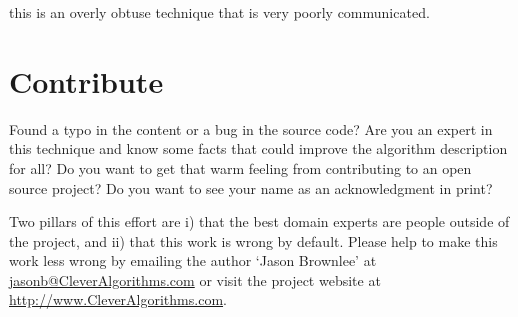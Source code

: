 \documentclass[a4paper, 11pt]{article}
\makeatletter
\newcommand{\myreportauthor}{Jason Brownlee}
\newcommand{\myreportemail}{jasonb@CleverAlgorithms.com}
\newcommand{\myreportwebsite}{http://www.CleverAlgorithms.com}
\makeatother
\begin{document}
this is an overly obtuse technique that is very poorly communicated.


% 
% 
\section{Contribute}
\label{sec:contribute}
Found a typo in the content or a bug in the source code? 
Are you an expert in this technique and know some facts that could improve the algorithm description for all?
Do you want to get that warm feeling from contributing to an open source project? 
Do you want to see your name as an acknowledgment in print?

Two pillars of this effort are i) that the best domain experts are people outside of the project, and ii) that this work is wrong by default. 
Please help to make this work less wrong by emailing the author `\myreportauthor' at \url{\myreportemail} or visit the project website at \url{\myreportwebsite}.



\end{document}
